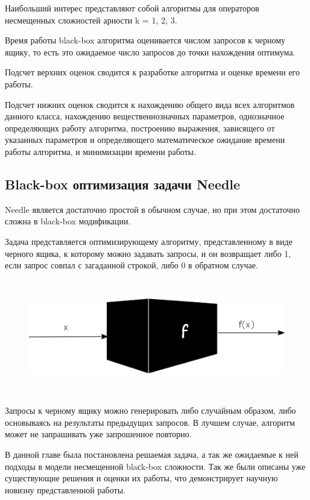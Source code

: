 Наибольший интерес представляют собой алгоритмы для операторов  несмещенных сложностей арности k = 1, 2, 3.

Время работы black-box алгоритма оценивается числом запросов к черному ящику,  то есть это ожидаемое число запросов до точки  нахождения оптимума.
	
Подсчет верхних оценок сводится к разработке алгоритма и оценке времени его работы.
	
Подсчет нижних оценок сводится к нахождению общего вида всех алгоритмов данного класса, нахождению вещественнозначных параметров, однозначное определяющих работу алгоритма, построению выражения, зависящего от указанных параметров и определяющего математическое ожидание времени работы алгоритма, и  минимизации времени работы.  

\subsection{Black-box оптимизация задачи Needle}

Needle является достаточно простой в обычном случае, но при этом достаточно сложна в black-box модификации.

Задача представляется оптимизирующему алгоритму, представленному в виде черного ящика, к  которому можно задавать запросы, и он возвращает либо 1, если запрос совпал с загаданной строкой, либо 0 в обратном случае. 

\begin{figure}[H]
\caption{}\label{fig3}
    \includegraphics[height=5cm]{ITMO/pic/blackbox.png}
\end{figure}

Запросы к черному ящику можно генерировать либо случайным образом, либо основываясь на результаты предыдущих запросов. В лучшем случае, алгоритм может не запрашивать уже запрошенное повторно.


\chapterconclusion

В данной главе была постановлена решаемая задача, а так же ожидаемые к ней подходы в модели несмещенной blaсk-box сложности. Так же были описаны уже существующие решения и оценки их работы, что демонстрирует научную новизну представленной работы. 



